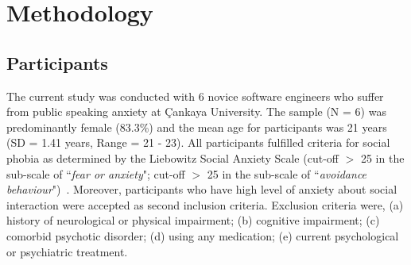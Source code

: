 \documentclass{llncs}
\begin{document}
\section{Methodology}
\subsection{Participants}
The current study was conducted with 6 novice software engineers who suffer from public speaking anxiety at \c{C}ankaya University. The sample (N = 6) was predominantly female (83.3\%) and the mean age for participants was 21 years (SD = 1.41 years, Range = 21 - 23). All participants fulfilled criteria for social phobia as determined by the Liebowitz Social Anxiety Scale (cut-off $>$ 25 in the sub-scale of ``\emph{fear or anxiety}"; cut-off $>$ 25 in the sub-scale of ``\emph{avoidance behaviour}")~\cite{liebowitz1987social}. Moreover, participants who have high level of anxiety about social interaction were accepted as second inclusion criteria. Exclusion criteria were, (a) history of neurological or physical impairment; (b) cognitive impairment; (c) comorbid psychotic disorder; (d) using any medication; (e) current psychological or psychiatric treatment.
\end{document}
